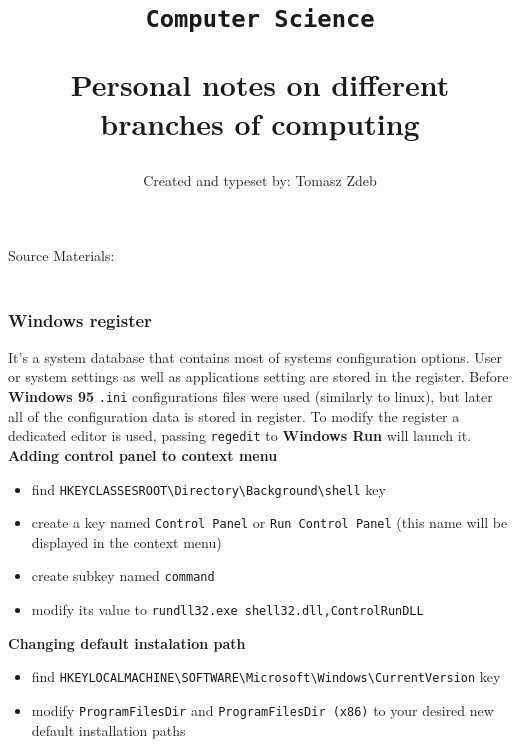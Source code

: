 \documentclass[11pt,a4paper]{article}
\date{\vspace{-3em}}
\title{\vspace{-2em}\texttt{Computer Science} \begin{large} Personal notes on different branches of computing\end{large}\vspace{-0.5em}}
\author{Created and typeset by: Tomasz Zdeb}
\def\bs{\textbackslash}
\def\us{\textunderscore}
\def\source_space{\vspace{0.2em}}
\newcommand{\myline}[2]{\noindent\makebox[\linewidth]{\rule{#1cm}{#2pt}}}
\begin{document}
\maketitle
\myline{16}{1}

\begin{scriptsize}
Source Materials:\\
\source_space\\
\end{scriptsize}

\myline{16}{1}


\subsubsection{Windows register}
It's a system database that contains most of systems configuration options. User or system settings as well as applications setting are stored in the register. Before \textbf{Windows 95} \texttt{.ini} configurations files were used (similarly to linux), but later all of the configuration data is stored in register. To modify the register a dedicated editor is used, passing \texttt{regedit} to \textbf{Windows Run} will launch it.\\

\textbf{Adding control panel to context menu}
\begin{itemize}
\item find \texttt{HKEY{\us}CLASSES{\us}ROOT{\bs}Directory{\bs}Background{\bs}shell} key
\item create a key named \texttt{Control Panel} or \texttt{Run Control Panel} (this name will be displayed in the context menu)
\item create subkey named \texttt{command}
\item modify its value to \texttt{rundll32.exe shell32.dll,Control{\us}RunDLL}
\end{itemize}

\textbf{Changing default instalation path}

\begin{itemize}
\item find \texttt{HKEY{\us}LOCAL{\us}MACHINE{\bs}SOFTWARE{\bs}Microsoft{\bs}Windows{\bs}CurrentVersion} key
\item modify \texttt{ProgramFilesDir} and \texttt{ProgramFilesDir (x86)} to your desired new default installation paths
\end{itemize}
\end{document}
